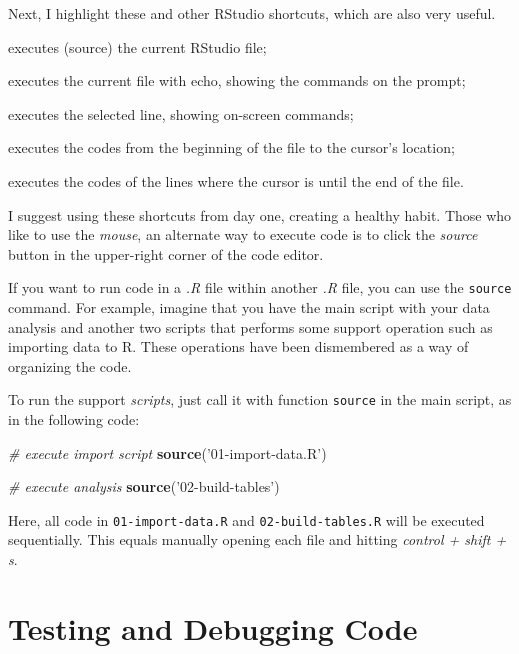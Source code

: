 \documentclass[
  12pt,
]{book}
\newenvironment{Shaded}{\begin{snugshade}}{\end{snugshade}}
\newcommand{\CommentTok}[1]{\textcolor[rgb]{0.37,0.37,0.37}{\textit{#1}}}
\newcommand{\KeywordTok}[1]{\textcolor[rgb]{0.27,0.27,0.27}{\textbf{#1}}}
\newcommand{\NormalTok}[1]{#1}
\newcommand{\StringTok}[1]{\textcolor[rgb]{0.5,0.5,0.5}{#1}}
\providecommand{\tightlist}{%
  \setlength{\itemsep}{0pt}\setlength{\parskip}{0pt}}
\begin{document}
Next, I highlight these and other RStudio shortcuts, which are also very useful.

\begin{description}
\tightlist
\item[control + shift + s]
executes (source) the current RStudio file;
\item[control + shift + enter]
executes the current file with echo, showing the commands on the prompt;
\item[control + enter]
executes the selected line, showing on-screen commands;
\item[control + shift + b]
executes the codes from the beginning of the file to the cursor's location;
\item[control + shift + e]
executes the codes of the lines where the cursor is until the end of the file.
\end{description}

I suggest using these shortcuts from day one, creating a healthy habit. Those who like to use the \emph{mouse}, an alternate way to execute code is to click the \emph{source} button in the upper-right corner of the code editor.

If you want to run code in a \emph{.R} file within another \emph{.R} file, you can use the \texttt{source} command. For example, imagine that you have the main script with your data analysis and another two scripts that performs some support operation such as importing data to R. These operations have been dismembered as a way of organizing the code. 

To run the support \emph{scripts}, just call it with function \texttt{source} in the main script, as in the following code:

\begin{Shaded}
\begin{Highlighting}[]
\CommentTok{# execute import script}
\KeywordTok{source}\NormalTok{(}\StringTok{'01-import-data.R'}\NormalTok{)}

\CommentTok{# execute analysis}
\KeywordTok{source}\NormalTok{(}\StringTok{'02-build-tables'}\NormalTok{)}
\end{Highlighting}
\end{Shaded}

Here, all code in \texttt{01-import-data.R} and \texttt{02-build-tables.R} will be executed sequentially. This equals manually opening each file and hitting \emph{control + shift + s}.

\hypertarget{testing-and-debugging-code}{%
\section{Testing and Debugging Code}\label{testing-and-debugging-code}}
\end{document}
